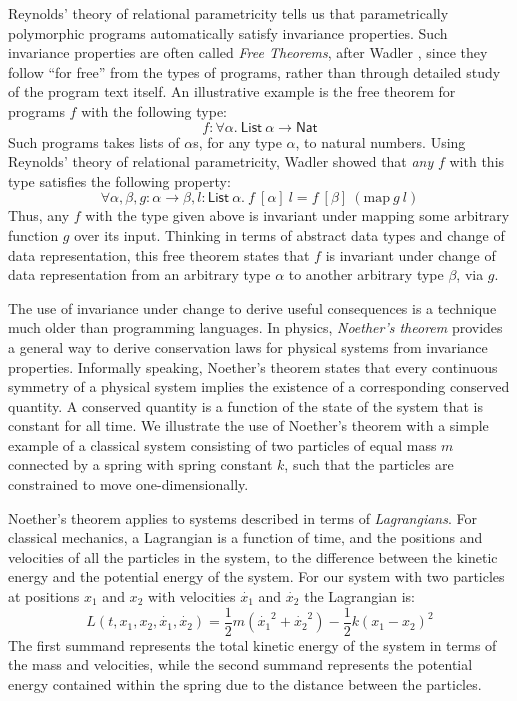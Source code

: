 \documentclass[preprint]{sigplanconf}
\theoremstyle{examplestyle}
\begin{document}
Reynolds' theory of relational parametricity \cite{reynolds82} tells
us that parametrically polymorphic programs automatically satisfy
invariance properties. Such invariance properties are often called
\emph{Free Theorems}, after Wadler \cite{wadler89theorems}, since they
follow ``for free'' from the types of programs, rather than through
detailed study of the program text itself. An illustrative example is
the free theorem for programs $f$ with the following type:
\begin{displaymath}
  f : \forall \alpha.~\mathsf{List}~\alpha \to \mathsf{Nat}
\end{displaymath}
Such programs takes lists of $\alpha$s, for any type $\alpha$, to
natural numbers. Using Reynolds' theory of relational parametricity,
Wadler showed that \emph{any} $f$ with this type satisfies the
following property:
\begin{displaymath}
  \forall \alpha, \beta, g : \alpha \to \beta, l : \mathsf{List}~\alpha.~f~[\alpha]~l = f~[\beta]~(\mathrm{map}~g~l)
\end{displaymath}
Thus, any $f$ with the type given above is invariant under mapping
some arbitrary function $g$ over its input. Thinking in terms of
abstract data types and change of data representation, this free
theorem states that $f$ is invariant under change of data
representation from an arbitrary type $\alpha$ to another arbitrary
type $\beta$, via $g$.

The use of invariance under change to derive useful consequences is a
technique much older than programming languages. In physics,
\emph{Noether's theorem} \cite{noether} provides a general way to
derive conservation laws for physical systems from invariance
properties. Informally speaking, Noether's theorem states that every
continuous symmetry of a physical system implies the existence of a
corresponding conserved quantity. A conserved quantity is a function
of the state of the system that is constant for all time. We
illustrate the use of Noether's theorem with a simple example of a
classical system consisting of two particles of equal mass $m$
connected by a spring with spring constant $k$, such that the
particles are constrained to move one-dimensionally.


Noether's theorem applies to systems described in terms of
\emph{Lagrangians}. For classical mechanics, a Lagrangian is a
function of time, and the positions and velocities of all the
particles in the system, to the difference between the kinetic energy
and the potential energy of the system. For our system with two
particles at positions $x_1$ and $x_2$ with velocities $\dot{x_1}$ and
$\dot{x_2}$ the Lagrangian is:
\begin{equation}\label{eq:coupled-spring-lagrangian}
  L(t,x_1,x_2,\dot{x_1},\dot{x_2}) = \frac{1}{2}m(\dot{x_1}^2 + \dot{x_2}^2) - \frac{1}{2}k(x_1 - x_2)^2
\end{equation}
The first summand represents the total kinetic energy of the system in
terms of the mass and velocities, while the second summand represents
the potential energy contained within the spring due to the distance
between the particles.
\end{document}

